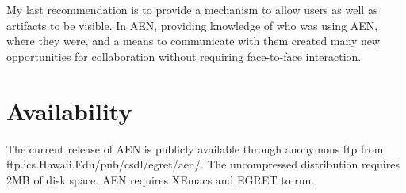 My last recommendation is to provide a mechanism to allow users as well as
artifacts to be visible.  In AEN, providing knowledge of who was using AEN,
where they were, and a means to communicate with them created many new
opportunities for collaboration without requiring face-to-face interaction.

\section{Availability}

The current release of AEN is publicly available through anonymous ftp from 
ftp.ics.Hawaii.Edu/pub/csdl/egret/aen/.  The uncompressed distribution
requires 2MB of disk space.  AEN requires XEmacs and EGRET to run.







